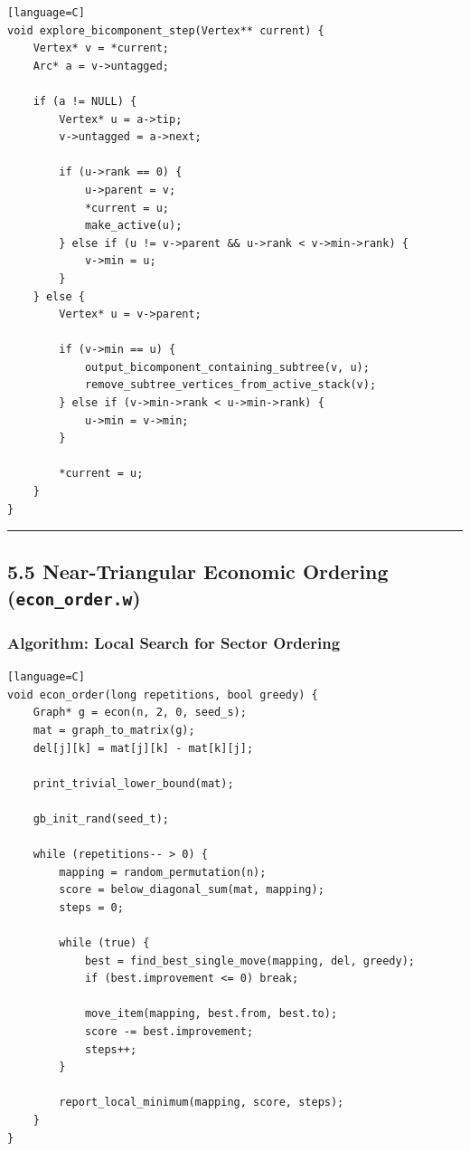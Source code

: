 \documentclass[11pt]{article}
\begin{document}
\begin{verbatim}[language=C]
void explore_bicomponent_step(Vertex** current) {
    Vertex* v = *current;
    Arc* a = v->untagged;

    if (a != NULL) {
        Vertex* u = a->tip;
        v->untagged = a->next;

        if (u->rank == 0) {
            u->parent = v;
            *current = u;
            make_active(u);
        } else if (u != v->parent && u->rank < v->min->rank) {
            v->min = u;
        }
    } else {
        Vertex* u = v->parent;

        if (v->min == u) {
            output_bicomponent_containing_subtree(v, u);
            remove_subtree_vertices_from_active_stack(v);
        } else if (v->min->rank < u->min->rank) {
            u->min = v->min;
        }

        *current = u;
    }
}
\end{verbatim}

\begin{center}\rule{0.5\linewidth}{0.5pt}\end{center}

\subsection{\texorpdfstring{5.5 Near-Triangular Economic Ordering (\texttt{econ\_order.w})}{5.5 Near-Triangular Economic Ordering (econ\_order.w)}}\label{near-triangular-economic-ordering-econ_order.w}

\subsubsection{Algorithm: Local Search for Sector Ordering}\label{algorithm-local-search-for-sector-ordering}

\begin{verbatim}[language=C]
void econ_order(long repetitions, bool greedy) {
    Graph* g = econ(n, 2, 0, seed_s);
    mat = graph_to_matrix(g);
    del[j][k] = mat[j][k] - mat[k][j];

    print_trivial_lower_bound(mat);

    gb_init_rand(seed_t);

    while (repetitions-- > 0) {
        mapping = random_permutation(n);
        score = below_diagonal_sum(mat, mapping);
        steps = 0;

        while (true) {
            best = find_best_single_move(mapping, del, greedy);
            if (best.improvement <= 0) break;

            move_item(mapping, best.from, best.to);
            score -= best.improvement;
            steps++;
        }

        report_local_minimum(mapping, score, steps);
    }
}
\end{verbatim}
\end{document}
